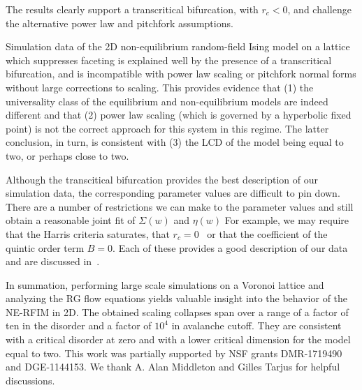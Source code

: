 \documentclass[reprint,amsmath,amssymb,aps,floatfix, prl]{revtex4-1}
\begin{document}
%
\noindent The results clearly support a transcritical bifurcation, with $r_c<0$, and challenge the alternative power law and pitchfork assumptions.\par
%
Simulation data of the 2D non-equilibrium random-field Ising model on a lattice which suppresses faceting is explained well by the presence of a transcritical bifurcation, and is incompatible with power law scaling or pitchfork normal forms without large corrections to scaling. This provides evidence that (1) the universality class of the equilibrium and non-equilibrium models are indeed different and that (2) power law scaling (which is governed by a hyperbolic fixed point) is not the correct approach for this system in this regime. The latter conclusion, in turn, is consistent with (3) the LCD of the model being equal to two, or perhaps close to two.   \par
%
Although the transcitical bifurcation provides the best description of our simulation data, the corresponding parameter values are difficult to pin down. There are a number of restrictions we can make to the parameter values and still obtain a reasonable joint fit of $\Sigma(w)$ and $\eta(w)$ For example, we may require that the Harris criteria saturates, that $r_c=0$~\cite{Perkovic96} or that the coefficient of the quintic order term $B=0$. Each of these provides a good description of our data and are discussed in~\cite[Section~\ref{supp-app:goodfits}]{RFIM2Dsupp}. \par
%
In summation, performing large scale simulations on a Voronoi lattice and analyzing the RG flow equations yields valuable insight into the behavior of the NE-RFIM in 2D. The obtained scaling collapses span over a range of a factor of ten in the disorder and a factor of $10^4$ in avalanche cutoff. They are consistent with a critical disorder at zero and with a lower critical dimension for the model equal to two. 
%
This work was partially supported by NSF grants  DMR-1719490 and DGE-1144153. We thank A. Alan Middleton and Gilles Tarjus for helpful discussions. 

{}
\end{document}
